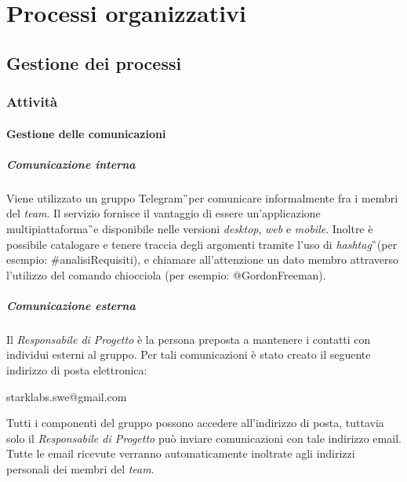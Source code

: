 \section{Processi organizzativi}
\subsection{Gestione dei processi}
\subsubsection{Attività}
\paragraph{Gestione delle comunicazioni}
\subparagraph{Comunicazione interna}
Viene utilizzato un gruppo Telegram\G\ per comunicare informalmente fra i membri del \textit{team}.
Il servizio fornisce il vantaggio di essere un'applicazione 
multipiattaforma\G\ e disponibile nelle versioni \textit{desktop}, \textit{web} e \textit{mobile}. Inoltre è possibile catalogare e tenere traccia degli argomenti tramite l'uso di \textit{hashtag}\G\ (per esempio: \#analisiRequisiti), e chiamare all'attenzione un dato membro attraverso l'utilizzo del comando chiocciola (per esempio: @GordonFreeman).

\subparagraph{Comunicazione esterna}
Il \textit{Responsabile di Progetto} è la persona preposta a mantenere i contatti con 
individui esterni al gruppo. Per tali comunicazioni è stato creato il 
seguente indirizzo di posta elettronica:
\begin{center}
	starklabs.swe@gmail.com
\end{center}
Tutti i componenti del gruppo possono accedere all'indirizzo di posta, tuttavia solo 
il \textit{Responsabile di Progetto} può inviare comunicazioni con tale indirizzo email. 
Tutte le email ricevute verranno automaticamente inoltrate agli indirizzi personali dei membri del \textit{team}.

